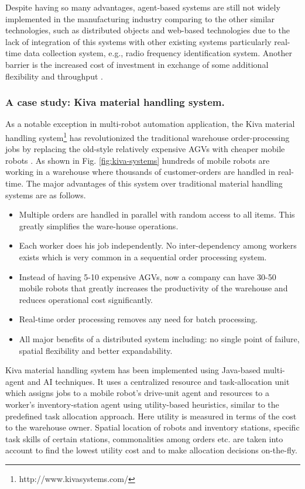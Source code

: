 Despite having so many advantages, agent-based systems are still not widely implemented in the manufacturing industry comparing to the other similar technologies, such as distributed objects and web-based technologies due to the lack of integration of this systems with other existing systems particularly real-time data collection system, e.g., radio frequency identification system. Another barrier is the increased cost of investment in exchange of some additional flexibility and throughput \cite{Schild+2007}.
\subsubsection*{A case study:  Kiva material handling system.}
 As a notable exception in multi-robot automation application, the Kiva material handling system\footnote{http://www.kivasystems.com/}  has revolutionized the traditional warehouse order-processing jobs by replacing the old-style relatively expensive AGVs with cheaper mobile robots \cite{Wurman+2008}. As shown in Fig. \ref{fig:kiva-systems} hundreds of mobile robots are working in a warehouse where thousands of customer-orders are handled in real-time. The major advantages of this system over traditional material handling systems are as follows.
 \begin{itemize}
\item Multiple orders are handled in parallel with random access to all items. This greatly simplifies the ware-house operations.
\item Each worker does his job independently. No inter-dependency among workers exists which is very common in a sequential order processing system.
\item Instead of having 5-10 expensive AGVs, now a company can have 30-50 mobile robots  that greatly increases the productivity of the warehouse and reduces operational cost significantly.
\item Real-time order processing removes any need for batch processing.
\item All major benefits of a distributed system including: no single point of failure, spatial flexibility and better expandability.
\end{itemize}
%
Kiva material handling system has been implemented using Java-based multi-agent and AI techniques. It uses a centralized  resource and task-allocation unit which assigns jobs to a mobile robot's drive-unit agent and resources to a worker's inventory-station agent using utility-based heuristics, similar to the predefined task allocation approach. Here utility is measured in terms of the cost to the warehouse owner. Spatial location of robots and inventory stations, specific task skills of certain stations, commonalities among orders etc. are taken into account to find the lowest utility cost and to make allocation decisions on-the-fly. 

